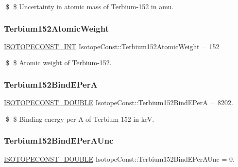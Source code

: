 \$ \$ Uncertainty in atomic mass of Terbium-\/152 in amu. \mbox{\label{group___isotope_const-_terbium-_tb152_gab507a2dcf9811171356e963bf4bd3e6c}} 
\subsubsection{\texorpdfstring{Terbium152\+Atomic\+Weight}{Terbium152AtomicWeight}}
{\footnotesize\ttfamily \mbox{\hyperlink{group___isotope_const-_macros_ga5f18360b3e99483a35c32d789e62621c}{I\+S\+O\+T\+O\+P\+E\+C\+O\+N\+S\+T\+\_\+\+I\+NT}} Isotope\+Const\+::\+Terbium152\+Atomic\+Weight = 152}

\$ \$ Atomic weight of Terbium-\/152. \mbox{\label{group___isotope_const-_terbium-_tb152_gaa1b7f2da831a42be4aa3b41bbe2ce88c}} 
\subsubsection{\texorpdfstring{Terbium152\+Bind\+E\+PerA}{Terbium152BindEPerA}}
{\footnotesize\ttfamily \mbox{\hyperlink{group___isotope_const-_macros_ga8f45a7272ce02c0b4c65c44636ed719a}{I\+S\+O\+T\+O\+P\+E\+C\+O\+N\+S\+T\+\_\+\+D\+O\+U\+B\+LE}} Isotope\+Const\+::\+Terbium152\+Bind\+E\+PerA = 8202.}

\$ \$ Binding energy per A of Terbium-\/152 in keV. \mbox{\label{group___isotope_const-_terbium-_tb152_gaf53a40e61354db6caf883b320d2d0d16}} 
\subsubsection{\texorpdfstring{Terbium152\+Bind\+E\+Per\+A\+Unc}{Terbium152BindEPerAUnc}}
{\footnotesize\ttfamily \mbox{\hyperlink{group___isotope_const-_macros_ga8f45a7272ce02c0b4c65c44636ed719a}{I\+S\+O\+T\+O\+P\+E\+C\+O\+N\+S\+T\+\_\+\+D\+O\+U\+B\+LE}} Isotope\+Const\+::\+Terbium152\+Bind\+E\+Per\+A\+Unc = 0.}

